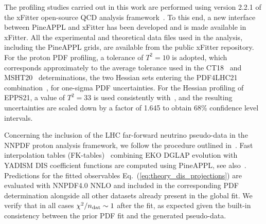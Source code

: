 The profiling studies carried out in this work are performed using version 2.2.1
of the 
{\sc\small xFitter} open-source QCD analysis framework~\cite{Alekhin:2014irh, Bertone:2017tig, xFitter:2022zjb, xFitter:web}.
%
To this end, a new interface between  {\sc\small PineAPPL} and {\sc\small xFitter} has been developed and is made available in {\sc\small xFitter}.
%
All the experimental and theoretical data files used in the analysis, including
the  {\sc\small PineAPPL}  grids, are available
from the public {\sc\small xFitter} repository.
%
For the proton PDF profiling, a tolerance of $T^2 = 10$ is adopted,
which  corresponds approximately to the average tolerance
used in the CT18~\cite{Hou:2019efy} and MSHT20~\cite{Bailey:2020ooq} determinations,
the two Hessian sets entering the PDF4LHC21 combination~\cite{PDF4LHCWorkingGroup:2022cjn}, for
one-sigma PDF uncertainties.
%
For the Hessian profiling of EPPS21, a value of $T^2 = 33$ is used consistently with~\cite{Eskola:2021nhw}, and the resulting uncertainties are scaled down by a factor of 1.645 to obtain 68\% confidence level intervals.

Concerning the inclusion of the LHC far-forward neutrino pseudo-data
in the NNPDF proton analysis framework, we follow the procedure
outlined in~\cite{NNPDF:2021uiq}.
%
Fast interpolation tables (FK-tables)~\cite{Ball:2010de} combining {\sc\small EKO}
DGLAP evolution with {\sc\small YADISM} DIS coefficient functions
are computed using {\sc\small PineAPPL}, see also~\cite{Barontini:2023vmr}.
%
Predictions for the fitted observables Eq.~(\ref{eq:theory_dis_projections}) are evaluated
with NNPDF4.0 NNLO and included in the corresponding PDF determination
alongside all other datasets already present in the global fit.
%
We verify that in all cases $\chi^2/n_{\rm dat}\sim 1$ after the fit,
as expected given the built-in consistency between the prior PDF fit
and the generated pseudo-data.




